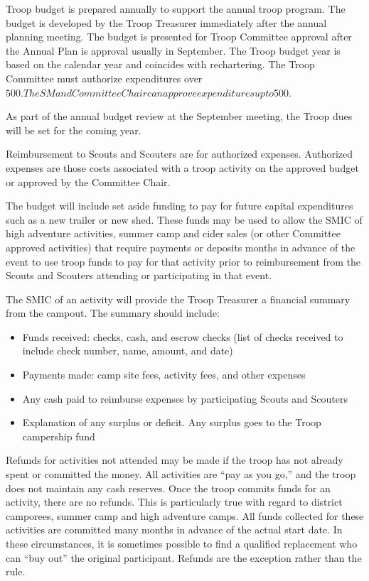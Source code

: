 \documentclass{ltxguide}
\begin{document}
Troop budget is prepared annually to support the annual troop program. The budget is developed by the Troop Treasurer immediately after the annual planning meeting. The budget is presented for Troop Committee approval after the Annual Plan is approval usually in September. The Troop budget year is based on the calendar year and coincides with rechartering. The Troop Committee must authorize expenditures over $500. The SM and Committee Chair can approve expenditures up to $500.

As part of the annual budget review at the September meeting, the Troop dues will be set for the coming year.

Reimbursement to Scouts and Scouters are for authorized expenses. Authorized expenses are those costs associated with a troop activity on the approved budget or approved by the Committee Chair.

The budget will include set aside funding to pay for future capital expenditures such as a new trailer or new shed. These funds may be used to allow the SMIC of high adventure activities, summer camp and cider sales (or other Committee approved activities) that require payments or deposits months in advance of the event to use troop funds to pay for that activity prior to reimbursement from the Scouts and Scouters attending or participating in that event.

The SMIC of an activity will provide the Troop Treasurer a financial summary from the campout. The summary should include:
\begin{itemize}
	\item Funds received: checks, cash, and escrow checks (list of checks received to include check number, name, amount, and date)
	\item Payments made: camp site fees, activity fees, and other expenses
	\item Any cash paid to reimburse expenses by participating Scouts and Scouters
	\item Explanation of any surplus or deficit. Any surplus goes to the Troop campership fund
\end{itemize}

Refunds for activities not attended may be made if the troop has not already spent or committed the money. All activities are “pay as you go,” and the troop does not maintain any cash reserves. Once the troop commits funds for an activity, there are no refunds. This is particularly true with regard to district camporees, summer camp and high adventure camps. All funds collected for these activities are committed many months in advance of the actual start date. In these circumstances, it is sometimes possible to find a qualified replacement who can “buy out” the original participant. Refunds are the exception rather than the rule.
\end{document}
